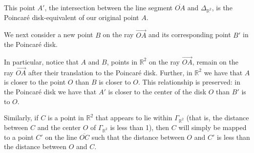\documentclass[12pt]{article}
\newcommand{\R}{\mathbb{R}}
\newcommand{\poincare}{Poincar\'{e} }
\theoremstyle{plain}
\theoremstyle{definition}
\begin{document}
\begin{appendices}
\begin{center}
\end{center}

This point $A'$, the intersection between the line segment $\overline{OA}$ and $\Delta_{\R^2}$, is the \poincare disk-equivalent of our original point $A$.

We next consider a new point $B$ on the ray $\overrightarrow{OA}$ and its corresponding point $B'$ in the \poincare disk. 

\begin{center}
\end{center}

In particular, notice that $A$ and $B$, points in $\R^2$ on the ray $\overrightarrow{OA}$, remain on the ray $\overrightarrow{OA}$ after their translation to the \poincare disk. Further, in $\R^2$ we have that $A$ is closer to the point $O$ than $B$ is closer to $O$. This relationship is preserved: in the \poincare disk we have that $A'$ is closer to the center of the disk $O$ than $B'$ is to $O$.


Similarly, if $C$ is a point in $\R^2$ that appears to lie within $\Gamma_{\R^2}$ (that is, the distance between $C$ and the center $O$ of $\Gamma_{\R^2}$ is less than 1), then $C$ will simply be mapped to a point $C'$ on the line $\overline{OC}$ such that the distance between $O$ and $C'$ is less than the distance between $O$ and $C$. 


\end{appendices}
\end{document}
